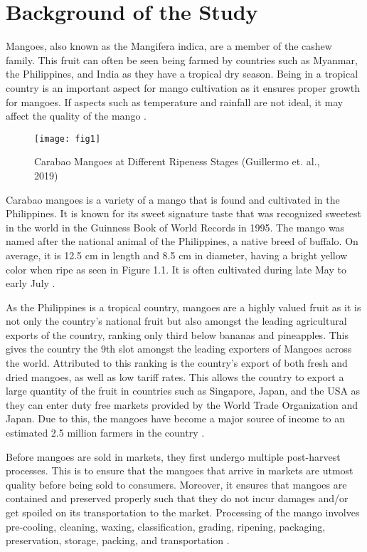 \section{Background of the Study}

Mangoes, also known as the Mangifera indica, are a member of the cashew family. 
This fruit can often be seen being farmed by countries such as Myanmar, the Philippines, 
and India as they have a tropical dry season. Being in a tropical country is an important 
aspect for mango cultivation as it ensures proper growth for mangoes. 
If aspects such as temperature and rainfall are not ideal, it may affect the quality 
of the mango \cite{noauthor-mango-2024}. 
\begin{figure}[!htbp]
	\centering
		\texttt{[image: fig1]}
	\caption{Carabao Mangoes at Different Ripeness Stages (Guillermo et. al., 2019)}
	\label{fig:img1}
\end{figure}
Carabao mangoes is a variety of a mango that is found and cultivated in the Philippines. It is known for its sweet signature taste that was recognized sweetest in the world in the Guinness Book of World Records in 1995. The mango was named after the national animal of the Philippines, a native breed of buffalo. On average, it is 12.5 cm in length and 8.5 cm in diameter, having a bright yellow color when ripe as seen in Figure 1.1. It is often cultivated during late May to early July \cite{DBpediaCarabao}.

As the Philippines is a tropical country, mangoes are a highly valued fruit as it is not only the country’s national fruit but also amongst the leading agricultural exports of the country, ranking only third below bananas and pineapples. This gives the country the 9th slot amongst the leading exporters of Mangoes across the world. Attributed to this ranking is the country's export of both fresh and dried mangoes, as well as low tariff rates. This allows the country to export a large quantity of the fruit in countries such as Singapore, Japan, and the USA as they can enter duty free markets provided by the World Trade Organization and Japan. Due to this, the mangoes have become a major source of income to an estimated 2.5 million farmers in the country \cite{centino-current-nodate}.

Before mangoes are sold in markets, they first undergo multiple post-harvest processes. This is to ensure that the mangoes that arrive in markets are utmost quality before being sold to consumers. Moreover, it ensures that mangoes are contained and preserved properly such that they do not incur damages and/or get spoiled on its transportation to the market. Processing of the mango involves pre-cooling, cleaning, waxing, classification, grading, ripening, packaging, preservation, storage, packing, and transportation \cite{patel-novel-2019} \cite{rizwan-iqbal-classification-2022}.

